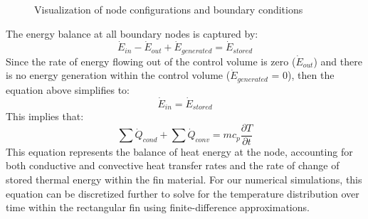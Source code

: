 \documentclass{article}
\newcommand{\pderiv}[2]{\displaystyle \frac{\partial #1}{\partial #2}}
\begin{document}
\begin{figure}[h]
    \centering
    \hspace{0.5cm}
    \hspace{0.5cm}
    \caption{Visualization of node configurations and boundary conditions}
    \label{fig:nodes}
\end{figure}

The energy balance at all boundary nodes is captured by:
\[
\dot{E}_{in} - \dot{E}_{out} + \dot{E}_{generated} = \dot{E}_{stored}    
\]
Since the rate of energy flowing out of the control volume is zero ($\dot{E}_{out}$) and there is no energy generation within the control volume ($\dot{E}_{generated}$ = 0), then the equation above simplifies to:
\[
\dot{E}_{in} = \dot{E}_{stored}    
\]
This implies that:
\begin{equation}
    \sum{\dot{Q}_{cond}} + \sum{\dot{Q}_{conv}} = m c_p \pderiv{T}{t}
    \label{eq:energy}
\end{equation}  
This equation represents the balance of heat energy at the node, accounting for both conductive and convective heat transfer rates and the rate of change of stored thermal energy within the fin material. For our numerical simulations, this equation can be discretized further to solve for the temperature distribution over time within the rectangular fin using finite-difference approximations.
\end{document}
